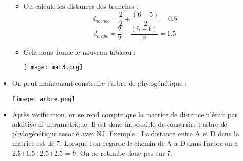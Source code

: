 \documentclass[
	12pt, %
]{fphw}
\begin{document}
\begin{center}
\begin{itemize}
\begin{itemize}
			\item On calcule les distances des branches :
				\[ d_{ab,abc} = \frac{2}{2} + \frac{(6-5)}{2} = 0.5 \]
				\[ d_{c,abc} = \frac{2}{2} + \frac{(5-6)}{2} = 1.5 \]
			\item Cela nous donne le nouveau tableau :
				\begin{center}
					\texttt{[image: mat3.png]} 
				\end{center}
			\end{itemize}
		\item On peut maintenant construire l'arbre de phylogénétique :
			\begin{center}
				\texttt{[image: arbre.png]} 
			\end{center}
		\item Après vérification, on se rend compte que la matrice de distance n'était pas additive ni ultramétrique. Il est donc impossible de construire l'arbre de phylogénétique associé avec NJ. Exemple : La distance entre A et D dans la matrice est de 7. Lorsque l'on regarde le chemin de A a D dans l'arbre on a 2.5+1.5+2.5+2.5 = 9. On ne retombe donc pas sur 7.
	\end{itemize}
	\
\end{center}

\end{document}
